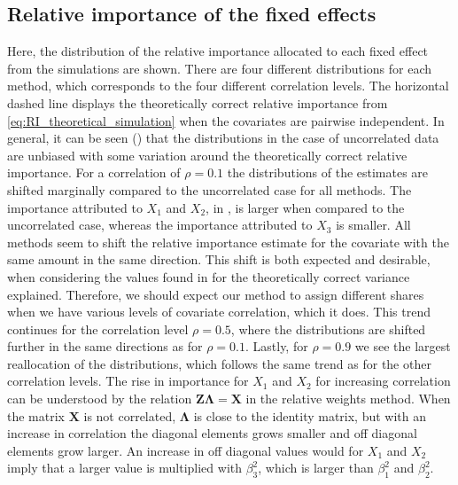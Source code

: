 \subsection{Relative importance of the fixed effects}
\label{sec:relimp_fixed}
Here, the distribution of the relative importance allocated to each fixed effect from the simulations are shown.
There are four different distributions for each method, which corresponds to the four different correlation levels. 
The horizontal dashed line displays the theoretically correct relative importance from \eqref{eq:RI_theoretical_simulation} when the covariates are pairwise independent. 
\newline
\newline
In general, it can be seen () that the distributions in the case of uncorrelated data are unbiased with some variation around the theoretically correct relative importance.
For a correlation of $\rho=0.1$ the distributions of the estimates are shifted marginally compared to the uncorrelated case for all methods.
The importance attributed to $X_1$ and $X_2$, in , is larger when compared to the uncorrelated case, whereas the importance attributed to $X_3$ is smaller.
All methods seem to shift the relative importance estimate for the covariate with the same amount in the same direction.
This shift is both expected and desirable, when considering the values found in  for the theoretically correct variance explained. 
Therefore, we should expect our method to assign different shares when we have various levels of covariate correlation, which it does.
This trend continues for the correlation level $\rho=0.5$, where the distributions are shifted further in the same directions as for $\rho=0.1$.
Lastly, for $\rho=0.9$ we see the largest reallocation of the distributions, which follows the same trend as for the other correlation levels.
\newline
\newline
The rise in importance for $X_1$ and $X_2$ for increasing correlation can be understood by the relation $\mathbf{Z}\boldsymbol{\Lambda}=\mathbf{X}$ in the relative weights method. 
When the matrix $\mathbf{X}$ is not correlated, $\boldsymbol{\Lambda}$ is close to the identity matrix, but with an increase in correlation the diagonal elements grows smaller and off diagonal elements grow larger.
An increase in off diagonal values would for $X_1$ and $X_2$ imply that a larger value is multiplied with $\beta_3^2$, which is larger than $\beta_1^2$ and $\beta_2^2$. 
